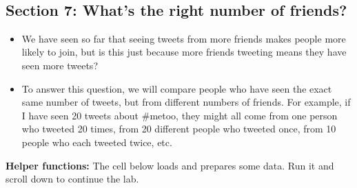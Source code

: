 \documentclass[11pt]{article}
\providecommand{\tightlist}{%
      \setlength{\itemsep}{0pt}\setlength{\parskip}{0pt}}
\begin{document}
    \begin{center}
    \end{center}
    { \hspace*{\fill} \\}
    
    \hypertarget{section-7-whats-the-right-number-of-friends}{%
\subsection{Section 7: What's the right number of
friends?}\label{section-7-whats-the-right-number-of-friends}}

\begin{itemize}
\tightlist
\item
  We have seen so far that seeing tweets from more friends makes people
  more likely to join, but is this just because more friends tweeting
  means they have seen more tweets?
\item
  To answer this question, we will compare people who have seen the
  exact same number of tweets, but from different numbers of friends.
  For example, if I have seen 20 tweets about \#metoo, they might all
  come from one person who tweeted 20 times, from 20 different people
  who tweeted once, from 10 people who each tweeted twice, etc.
\end{itemize}

\textbf{Helper functions:} The cell below loads and prepares some data.
Run it and scroll down to continue the lab.
\end{document}

